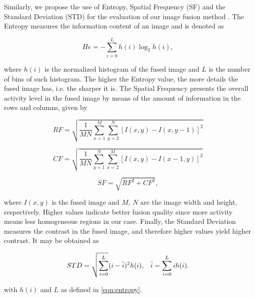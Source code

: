 Similarly, we propose the use of Entropy, Spatial Frequency (SF) and the Standard Deviation (STD) for the evaluation of our image fusion method \cite{naidu2008pixel}. The Entropy measures the information content of an image and is denoted as

\begin{equation}
\label{eqn:entropy}
He = - \sum_{i = 0}^{L} h(i) \log_2 h(i),
\end{equation}

\noindent where $h(i)$ is the normalized histogram of the fused image and $L$ is the number of bins of such histogram. The higher the Entropy value, the more details the fused image has, i.e. the sharper it is. The Spatial Frequency presents the overall activity level in the fused image by means of the amount of information in the rows and columns, given by

\begin{equation*}
RF = \sqrt{\frac{1}{M N} 
            \sum_{x = 1}^{M}
            \sum_{y = 2}^{N}
            \left[
                I(x,y) - I(x,y - 1)
            \right]^{2}
}
\end{equation*}

\vspace{0.25cm}

\begin{equation*}
CF = \sqrt{\frac{1}{M N} 
            \sum_{y = 1}^{N}
            \sum_{x = 2}^{M}
            \left[
                I(x,y) - I(x - 1,y)
            \right]^{2}
}
\end{equation*}

\vspace{0.25cm}

\begin{equation}
\label{eqn:spatial_frequency}
SF = \sqrt{RF^{2} + CF^{2}},
\end{equation}

\noindent where $I(x,y)$ is the fused image and $M$, $N$ are the image width and height, respectively. Higher values indicate better fusion quality since more activity means less homogeneous regions in our case. Finally, the Standard Deviation measures the contrast in the fused image, and therefore higher values yield higher contrast. It may be obtained as

\begin{align}
\label{eqn:standard_deviation}
STD = \sqrt{\sum_{i = 0}^{L}}(i - \Bar{i})^{2} h(i),
&&
\Bar{i} = \sum_{i = 0}^{L}i h(i).
\end{align}

\noindent with $h(i)$ and $L$ as defined in \autoref{eqn:entropy}.
